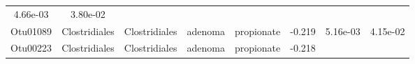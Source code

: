 \documentclass[11pt,]{article}
\begin{document}
\begin{longtable}[]{@{}cccccccc@{}}
\begin{minipage}[t]{0.08\columnwidth}
4.66e-03\strut
\end{minipage} & \begin{minipage}[t]{0.08\columnwidth}\centering\strut
3.80e-02\strut
\end{minipage}\tabularnewline
\begin{minipage}[t]{0.08\columnwidth}\centering\strut
Otu01089\strut
\end{minipage} & \begin{minipage}[t]{0.15\columnwidth}\centering\strut
Clostridiales\strut
\end{minipage} & \begin{minipage}[t]{0.15\columnwidth}\centering\strut
Clostridiales\strut
\end{minipage} & \begin{minipage}[t]{0.08\columnwidth}\centering\strut
adenoma\strut
\end{minipage} & \begin{minipage}[t]{0.09\columnwidth}\centering\strut
propionate\strut
\end{minipage} & \begin{minipage}[t]{0.07\columnwidth}\centering\strut
-0.219\strut
\end{minipage} & \begin{minipage}[t]{0.08\columnwidth}\centering\strut
5.16e-03\strut
\end{minipage} & \begin{minipage}[t]{0.08\columnwidth}\centering\strut
4.15e-02\strut
\end{minipage}\tabularnewline
\begin{minipage}[t]{0.08\columnwidth}\centering\strut
Otu00223\strut
\end{minipage} & \begin{minipage}[t]{0.15\columnwidth}\centering\strut
Clostridiales\strut
\end{minipage} & \begin{minipage}[t]{0.15\columnwidth}\centering\strut
Clostridiales\strut
\end{minipage} & \begin{minipage}[t]{0.08\columnwidth}\centering\strut
adenoma\strut
\end{minipage} & \begin{minipage}[t]{0.09\columnwidth}\centering\strut
propionate\strut
\end{minipage} & \begin{minipage}[t]{0.07\columnwidth}\centering\strut
-0.218\strut
\end{minipage} & \begin{minipage}[t]{0.08\columnwidth}\centering\strut

\end{minipage}
\end{longtable}
\end{document}
